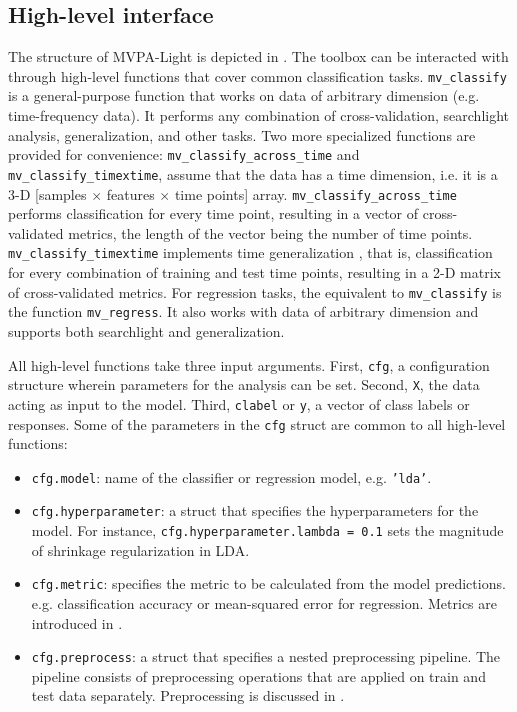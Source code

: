 \documentclass[utf8]{frontiersSCNS} %
\newcommand{\ttt}[1]{\texttt{#1}}
\begin{document}
\subsection{High-level interface}\label{sec:interface}

The structure of MVPA-Light is depicted in . The toolbox can be interacted with through high-level functions that cover common classification tasks. \ttt{mv\_classify} is a  general-purpose function that works on data of arbitrary dimension (e.g. time-frequency data). It performs any combination of cross-validation, searchlight analysis, generalization, and other tasks. Two more specialized functions are provided for convenience: \ttt{mv\_classify\_across\_time}  and \ttt{mv\_classify\_timextime}, assume that the data has a time dimension, i.e. it is a 3-D [samples $\times$ features $\times$ time points] array. \ttt{mv\_classify\_across\_time} performs classification for every time point, resulting in a vector of cross-validated metrics, the length of the vector being the number of time points. \ttt{mv\_classify\_timextime} implements time generalization \citep{King2014}, that is, classification for every combination of training and test time points, resulting in a 2-D matrix of cross-validated metrics. For regression tasks, the equivalent to \ttt{mv\_classify} is the function \ttt{mv\_regress}. It also works with data of arbitrary dimension and supports both searchlight and generalization.

All high-level functions take three input arguments. First, \ttt{cfg}, a configuration structure wherein parameters for the analysis can be set. Second, \ttt{X}, the data acting as input to the model. Third, \ttt{clabel} or \ttt{y}, a vector of class labels or responses. Some of the parameters in the \ttt{cfg} struct are common  to all high-level functions:

\begin{itemize}
    \item \ttt{cfg.model}: name of the classifier or regression model, e.g. \ttt{'lda'}.
    \item \ttt{cfg.hyperparameter}: a struct that specifies the hyperparameters for the model. For instance, \ttt{cfg.hyperparameter.lambda = 0.1} sets the magnitude of shrinkage regularization in LDA.
    \item \ttt{cfg.metric}: specifies the metric to be calculated from the model predictions. e.g. classification accuracy or mean-squared error for regression. Metrics are introduced in .
    \item \ttt{cfg.preprocess}: a struct that specifies a nested preprocessing pipeline. The pipeline consists of preprocessing operations that are applied on train and test data separately. Preprocessing is discussed in .
\end{itemize}
\end{document}
